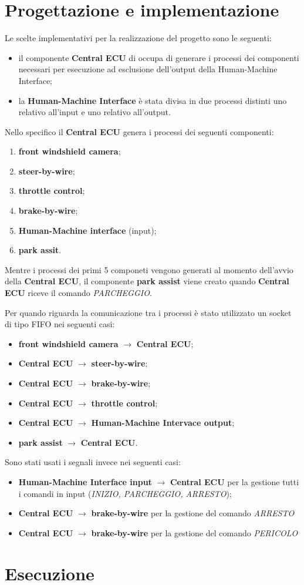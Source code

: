 \documentclass[12pt]{article}
\begin{document}
\section{Progettazione e implementazione}
Le scelte implementativi per la realizzazione del progetto sono le seguenti:
\begin{itemize}
    \item il componente {\bf Central ECU} di occupa di generare i processi dei 
    componenti necessari per esecuzione ad esclusione dell'output della Human-Machine 
    Interface;
    \item la {\bf Human-Machine Interface} \`{e} stata divisa in due processi 
    distinti uno relativo all'input e uno relativo all'output. 
\end{itemize}
Nello specifico il {\bf Central ECU} genera i processi dei seguenti componenti:
\begin{enumerate}
    \item {\bf front windshield camera};
    \item {\bf steer-by-wire};
    \item {\bf throttle control};
    \item {\bf brake-by-wire};
    \item {\bf Human-Machine interface} (input);
    \item {\bf park assit}.
\end{enumerate}
Mentre i processi dei primi 5 componeti vengono generati al momento dell'avvio 
della {\bf Central ECU}, il componente {\bf park assist} viene creato quando 
{\bf Central ECU} riceve il comando {\it PARCHEGGIO}. 

Per quando riguarda la comunicazione tra i processi \`{e} stato utilizzato un 
socket di tipo FIFO nei seguenti casi:
\begin{itemize}
    \item {\bf front windshield camera} $\to$ {\bf Central ECU};
    \item {\bf Central ECU} $\to$ {\bf steer-by-wire};
    \item {\bf Central ECU} $\to$ {\bf brake-by-wire};
    \item {\bf Central ECU} $\to$ {\bf throttle control};
    \item {\bf Central ECU} $\to$ {\bf Human-Machine Intervace output};
    \item {\bf park assist} $\to$ {\bf Central ECU}.
\end{itemize} 

Sono stati usati i segnali invece nei seguenti casi:
\begin{itemize}
    \item {\bf Human-Machine Interface input} $\to$ {\bf Central ECU} per la 
    gestione tutti i comandi in input ({\it INIZIO, PARCHEGGIO, ARRESTO});
    \item {\bf Central ECU} $\to$ {\bf brake-by-wire} per la gestione del comando 
    {\it ARRESTO}
    \item  {\bf Central ECU} $\to$ {\bf brake-by-wire} per la gestione del comando 
    {\it PERICOLO}
\end{itemize}
\section{Esecuzione}
\end{document}
